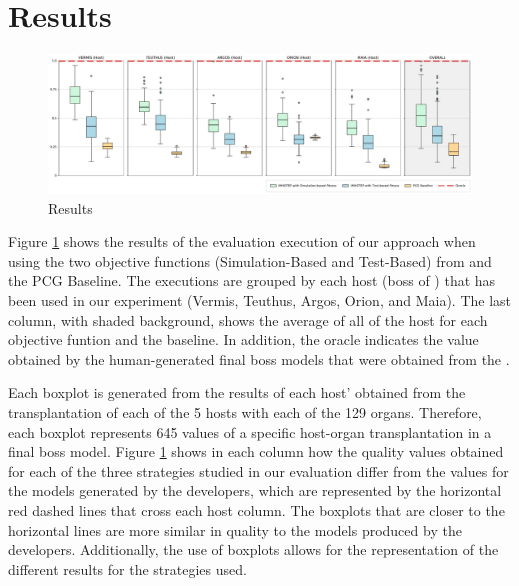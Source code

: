 \section{Results}
\label{sec:Results}

\begin{figure}
    \centering
    \includegraphics[width=\textwidth]{Figures/Imhotep_with_legend_and_oracle_average-v4.pdf}
    \caption{Results}
    \label{fig:results}
\end{figure}

Figure \ref{fig:results} shows the results of the evaluation execution of our approach when using the two objective functions (Simulation-Based and Test-Based) from \ApproachName{} and the PCG Baseline. The executions are grouped by each host (boss of \CaseStudy{}) that has been used in our experiment (Vermis, Teuthus, Argos, Orion, and Maia). The last column, with shaded background, shows the average of all of the host for each objective funtion and the baseline. In addition, the oracle indicates the value obtained by the human-generated final boss models that were obtained from the \CaseStudy{}. 

Each boxplot is generated from the results of each host' obtained from the transplantation of each of the 5 hosts with each of the 129 organs. Therefore, each boxplot represents 645 values of a specific host-organ transplantation in a final boss model. Figure \ref{fig:results} shows in each column how the quality values obtained for each of the three strategies studied in our evaluation differ from the values for the models generated by the developers, which are represented by the horizontal red dashed lines that cross each host column. The boxplots that are closer to the horizontal lines are more similar in quality to the models produced by the developers. Additionally, the use of boxplots allows for the representation of the different results for the strategies used.

